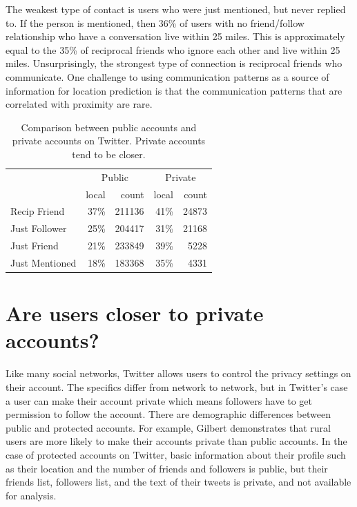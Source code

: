 The weakest type of contact is users who were just mentioned, but never
replied to.
%
If the person is mentioned, then 36\% of users with no
friend/follow relationship who have a conversation live within 25 miles.
%
This is approximately equal to the 35\% of reciprocal friends who ignore each
other and live within 25 miles.
%
Unsurprisingly, the strongest type of connection is reciprocal friends who
communicate.
%
One challenge to using communication patterns as a source of information for
location prediction is that the communication patterns that are correlated
with proximity are rare.

\begin{table}[tbh]
\centering
\begin{tabular}{l | r r | r r}
    & \multicolumn{2}{c}{Public}
    & \multicolumn{2}{|c}{Private} \\
    \cline{2-5}
    &local&count&local&count \\
    \hline
    Recip Friend & 37\%&211136 & 41\%&24873 \\
    Just Follower & 25\%&204417 & 31\%&21168 \\
    Just Friend & 21\%&233849 & 39\%&5228 \\
    Just Mentioned & 18\%&183368 & 35\%&4331 \\
\end{tabular}
\caption{
    Comparison between public accounts and private accounts on Twitter.
    Private accounts tend to be closer.
}
\label{tab:EdgeTypesProt}
\end{table}

\section{Are users closer to private accounts?}

Like many social networks, Twitter allows users to control the privacy settings
on their account.
%
The specifics differ from network to network, but in Twitter's case
a user can make their account private which means followers have to get
permission to follow the account.
%
There are demographic differences between public and protected accounts.
%
For example, Gilbert \cite{gilbert2008network} demonstrates that rural users
are more likely to make their accounts private than public accounts.
%
In the case of protected accounts on Twitter, basic information
about their profile such as their location and the number of friends and
followers is public, but their friends list, followers list, and the text of
their tweets is private, and not available for analysis.

